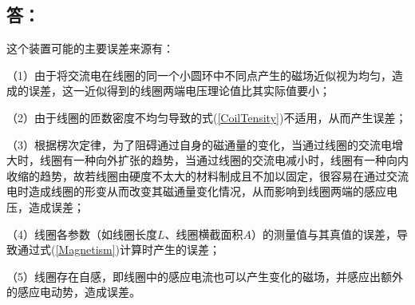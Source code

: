 \documentclass[10pt,a4paper]{article}
\theoremstyle{remark}
\begin{document}
\subsection{答：}
这个装置可能的主要误差来源有：

（1）由于将交流电在线圈的同一个小圆环中不同点产生的磁场近似视为均匀，造成的误差，这一近似得到的线圈两端电压理论值比其实际值要小；

（2）由于线圈的匝数密度不均匀导致的式(\ref{CoilTensity})不适用，从而产生误差；

（3）根据楞次定律，为了阻碍通过自身的磁通量的变化，当通过线圈的交流电增大时，线圈有一种向外扩张的趋势，当通过线圈的交流电减小时，线圈有一种向内收缩的趋势，故若线圈由硬度不太大的材料制成且不加以固定，很容易在通过交流电时造成线圈的形变从而改变其磁通量变化情况，从而影响到线圈两端的感应电压，造成误差；

（4）线圈各参数（如线圈长度$L$、线圈横截面积$A$）的测量值与其真值的误差，导致通过式(\ref{Magnetism})计算时产生的误差；

（5）线圈存在自感，即线圈中的感应电流也可以产生变化的磁场，并感应出额外的感应电动势，造成误差。
\section{}
\end{document}
